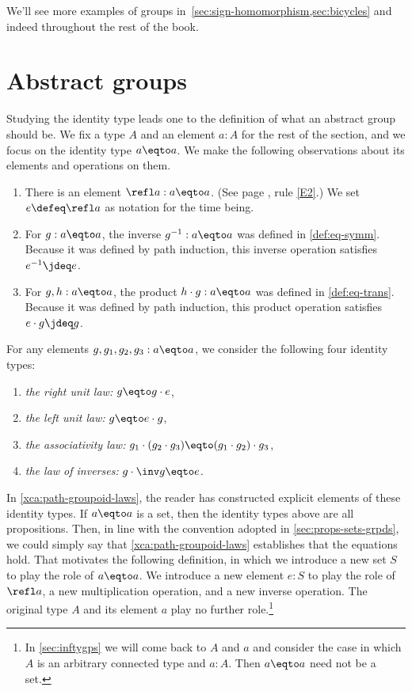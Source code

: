 We'll see more examples of groups in~\cref{sec:sign-homomorphism,sec:bicycles}
and indeed throughout the rest of the book.

\section{Abstract groups}
\label{sec:identity-type-as-abstract}

Studying the identity type leads one to the definition of what an 
abstract group should be. We fix a type $A$ and an element $a:A$ for the rest
of the section, and we focus on the identity type $a\eqto a$.
We make the following observations about its elements and operations on them.

\begin{enumerate}
\item
  There is an element $\refl a : a \eqto a$.
  (See page \pageref{rules-for-equality}, rule \ref{E2}.)
  We set $e \defeq \refl a$ as notation for the time being.
\item
  For $g : a \eqto a$, the inverse $g^{-1} : a \eqto a$ was defined in \cref{def:eq-symm}.
  Because it was defined by path induction, this inverse operation satisfies $e^{-1} \jdeq e$.
\item
  For $g, h : a \eqto a$, the product $h \cdot g : a \eqto a$ was defined in \cref{def:eq-trans}.
  Because it was defined by path induction, this product operation satisfies $e \cdot g \jdeq g$.
\end{enumerate}

For any elements $g,g_1,g_2,g_3:a\eqto a$, we consider the 
following four identity types:
\begin{enumerate}
\item
  \label{it:right-unit} \emph{the right unit law:} $g \eqto g\cdot e$,
\item
  \label{it:left-unit} \emph{the left unit law:} $g \eqto e\cdot g$,
\item
  \label{it:associativity} \emph{the associativity law:} $g_1\cdot(g_2\cdot g_3)
  \eqto (g_1\cdot g_2)\cdot g_3$,
\item
  \label{it:inverse} \emph{the law of inverses:} $g\cdot \inv g \eqto e$.
\end{enumerate}

In \cref{xca:path-groupoid-laws}, the reader has constructed explicit
elements of these identity types. 
If $a\eqto a$ is a set, then the identity types
above are all propositions. Then, in line with the convention adopted 
in \cref{sec:props-sets-grpds}, we could simply say that
\cref{xca:path-groupoid-laws} establishes that the equations hold.
That motivates the following definition, 
in which we introduce a new set $S$ to play the role of $a\eqto a$.
We introduce a new element $e:S$ to play the role of $\refl a$, 
a new multiplication operation, and a new inverse operation. 
The original type $A$ and its element $a$ play no further role.\footnote{%
In \cref{sec:inftygps} we will come back to $A$ and $a$ and
consider the case in which $A$ is an arbitrary connected type
and $a:A$. Then $a\eqto a$ need not be a set.}


